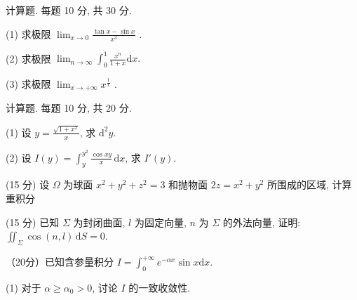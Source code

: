 \par{}
计算题. 每题 10 分, 共 30 分.\par
(1) 求极限  $\lim_{x\to0}\frac{\tan x-\sin x}{x^{3}}$ .\par
(2) 求极限 $\lim_{n\to \infty}\int_0^1\frac{x^n}{1 + x}\mathrm{d}x.$\par
(3) 求极限  $\lim_{x\to+\infty}x^{\frac{1}{x}}$ .\par
\par{}
计算题. 每题 10 分, 共 20 分.\par
(1) 设 $y = \frac{\sqrt{1 + x^2}}{x}$, 求 $\mathrm{d}^2 y$.\par
(2) 设 $I(y) = \int_{y}^{y^2} \frac{\cos xy}{x} \, \mathrm{d}x$, 求 $I'(y)$.\par
\par{}
\par{}
(15 分) 设 $\Omega$ 为球面 $x^{2} + y^{2} + z^{2} = 3$ 和抛物面 $2z = x^{2} + y^{2}$ 所围成的区域, 计算重积分\par
\nopagebreak[4]
\par{}
(15 分) 已知 $\Sigma$ 为封闭曲面, $l$ 为固定向量, $n$ 为 $\Sigma$ 的外法向量, 证明: $\iint_{\Sigma} \cos(n, l) \, \mathrm{d}S = 0$.\par
\par{}
（20分）已知含参量积分 $I = \int_0^{+\infty}e^{-\alpha x}\sin x\mathrm{d}x.$\par
(1) 对于 $\alpha \geq \alpha_0 > 0$, 讨论 $I$ 的一致收敛性.\par
